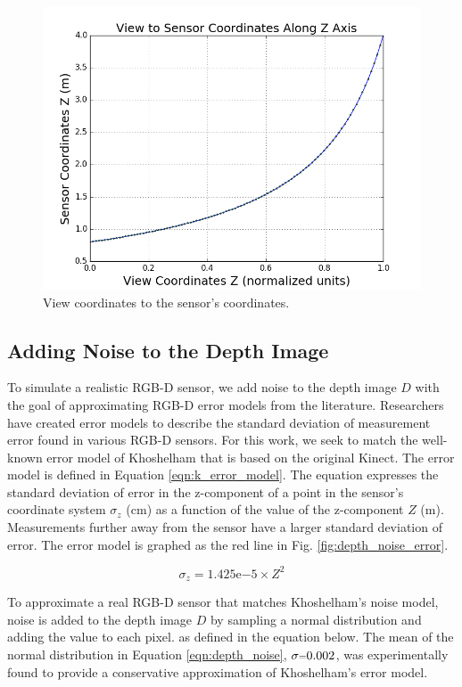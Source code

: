 \begin{figure}[h]%
\centering
  \includegraphics[width=.70\textwidth]{figures/depth_view_to_sensor.png}
  \caption{View coordinates to the sensor's coordinates.}
  \label{fig:depth_view_to_sensor}
\end{figure}

\subsection{Adding Noise to the Depth Image}

To simulate a realistic RGB-D sensor, we add noise to the depth image $D$ with
the goal of approximating RGB-D error models from the literature. Researchers
have created error models to describe the standard deviation of measurement
error found in various RGB-D sensors. For this work, we seek to match the
well-known error model of Khoshelham \cite{Khoshelham2012} that is based on the
original Kinect. The error model is defined in Equation \ref{eqn:k_error_model}.
The equation expresses the standard deviation of error in the z-component of a
point in the sensor's coordinate system $\sigma_z$ (cm) as a function of the
value of the z-component $Z$ (m). Measurements further away from the sensor have
a larger standard deviation of error. The error model is graphed as the red line
in Fig. \ref{fig:depth_noise_error}.

\begin{equation}
  \sigma_z = 1.425\mathrm{e}{-5} \times Z^2
  \label{eqn:k_error_model}
\end{equation}

To approximate a real RGB-D sensor that matches Khoshelham's noise model, noise
is added to the depth image $D$ by sampling a normal distribution and adding the
value to each pixel. as defined in the equation below. The mean of the normal
distribution in Equation \ref{eqn:depth_noise}, $\sigma\mathsmaller{=}0.002$,
was experimentally found to provide a conservative approximation of Khoshelham's
error model.

